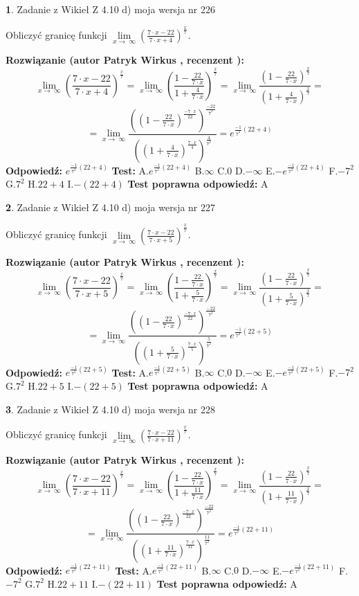 \documentclass[12pt, a4paper]{article}
\theoremstyle{definition} %
\newtheorem{zad}{}
\newcommand{\zadStart}[1]{\begin{zad}#1\newline}
\newcommand{\zadStop}{\end{zad}}
\newcommand{\rozwStart}[2]{\noindent \textbf{Rozwiązanie (autor #1 , recenzent #2): }\newline}
\newcommand{\rozwStop}{\newline}
\newcommand{\odpStart}{\noindent \textbf{Odpowiedź:}\newline}
\newcommand{\odpStop}{\newline}
\newcommand{\testStart}{\noindent \textbf{Test:}\newline}
\newcommand{\testStop}{\newline}
\newcommand{\kluczStart}{\noindent \textbf{Test poprawna odpowiedź:}\newline}
\newcommand{\kluczStop}{\newline}
\begin{document}
\zadStart{Zadanie z Wikieł Z 4.10 d) moja wersja nr 226}


Obliczyć granicę funkcji  $\lim\limits_{x\to\ \infty}(\frac{7\cdot x-22}{7\cdot x+4})^{\frac{x}{7}}$.
\zadStop
\rozwStart{Patryk Wirkus}{}
$$\lim\limits_{x\to\ \infty}(\frac{7\cdot x-22}{7\cdot x+4})^{\frac{x}{7}} = \lim\limits_{x\to\ \infty}(\frac{1-\frac{22}{7\cdot x}}{1+\frac{4}{7\cdot x}})^{\frac{x}{7}}=\lim\limits_{x\to\ \infty}\frac{(1-\frac{22}{7\cdot x})^{\frac{x}{7}}}{(1+\frac{4}{7\cdot x})^{\frac{x}{7}}}=$$
$$=\lim\limits_{x\to\ \infty}\frac{((1-\frac{22}{7\cdot x})^{\frac{-7\cdot x}{22}})^{\frac{-22}{7^{2}}}}{((1+\frac{4}{7\cdot x})^{\frac{7\cdot x}{4}})^{\frac{4}{7^{2}}}}=e^{\frac{-1}{7^{2}}(22+4)}$$
\rozwStop
\odpStart
$e^{\frac{-1}{7^{2}}(22+4)}$
\odpStop
\testStart
A.$e^{\frac{-1}{7^{2}}(22+4)}$ B.$\infty$ C.$0$ D.$-\infty$ E.$-e^{\frac{-1}{7^{2}}(22+4)}$
F.$-7^{2}$ G.$7^{2}$
H.$22+4$
I.$-(22+4)$
\testStop
\kluczStart
A
\kluczStop



\zadStart{Zadanie z Wikieł Z 4.10 d) moja wersja nr 227}


Obliczyć granicę funkcji  $\lim\limits_{x\to\ \infty}(\frac{7\cdot x-22}{7\cdot x+5})^{\frac{x}{7}}$.
\zadStop
\rozwStart{Patryk Wirkus}{}
$$\lim\limits_{x\to\ \infty}(\frac{7\cdot x-22}{7\cdot x+5})^{\frac{x}{7}} = \lim\limits_{x\to\ \infty}(\frac{1-\frac{22}{7\cdot x}}{1+\frac{5}{7\cdot x}})^{\frac{x}{7}}=\lim\limits_{x\to\ \infty}\frac{(1-\frac{22}{7\cdot x})^{\frac{x}{7}}}{(1+\frac{5}{7\cdot x})^{\frac{x}{7}}}=$$
$$=\lim\limits_{x\to\ \infty}\frac{((1-\frac{22}{7\cdot x})^{\frac{-7\cdot x}{22}})^{\frac{-22}{7^{2}}}}{((1+\frac{5}{7\cdot x})^{\frac{7\cdot x}{5}})^{\frac{5}{7^{2}}}}=e^{\frac{-1}{7^{2}}(22+5)}$$
\rozwStop
\odpStart
$e^{\frac{-1}{7^{2}}(22+5)}$
\odpStop
\testStart
A.$e^{\frac{-1}{7^{2}}(22+5)}$ B.$\infty$ C.$0$ D.$-\infty$ E.$-e^{\frac{-1}{7^{2}}(22+5)}$
F.$-7^{2}$ G.$7^{2}$
H.$22+5$
I.$-(22+5)$
\testStop
\kluczStart
A
\kluczStop



\zadStart{Zadanie z Wikieł Z 4.10 d) moja wersja nr 228}


Obliczyć granicę funkcji  $\lim\limits_{x\to\ \infty}(\frac{7\cdot x-22}{7\cdot x+11})^{\frac{x}{7}}$.
\zadStop
\rozwStart{Patryk Wirkus}{}
$$\lim\limits_{x\to\ \infty}(\frac{7\cdot x-22}{7\cdot x+11})^{\frac{x}{7}} = \lim\limits_{x\to\ \infty}(\frac{1-\frac{22}{7\cdot x}}{1+\frac{11}{7\cdot x}})^{\frac{x}{7}}=\lim\limits_{x\to\ \infty}\frac{(1-\frac{22}{7\cdot x})^{\frac{x}{7}}}{(1+\frac{11}{7\cdot x})^{\frac{x}{7}}}=$$
$$=\lim\limits_{x\to\ \infty}\frac{((1-\frac{22}{7\cdot x})^{\frac{-7\cdot x}{22}})^{\frac{-22}{7^{2}}}}{((1+\frac{11}{7\cdot x})^{\frac{7\cdot x}{11}})^{\frac{11}{7^{2}}}}=e^{\frac{-1}{7^{2}}(22+11)}$$
\rozwStop
\odpStart
$e^{\frac{-1}{7^{2}}(22+11)}$
\odpStop
\testStart
A.$e^{\frac{-1}{7^{2}}(22+11)}$ B.$\infty$ C.$0$ D.$-\infty$ E.$-e^{\frac{-1}{7^{2}}(22+11)}$
F.$-7^{2}$ G.$7^{2}$
H.$22+11$
I.$-(22+11)$
\testStop
\kluczStart
A
\kluczStop
\end{document}
